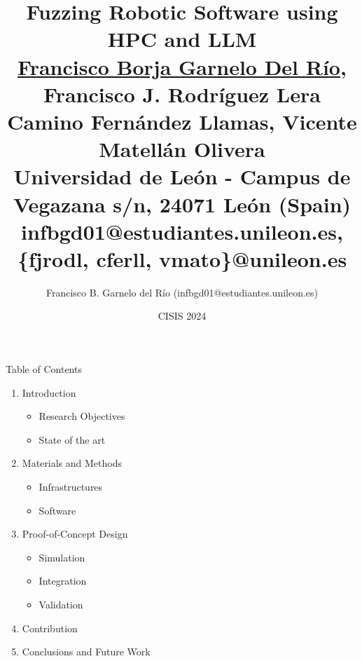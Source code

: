 \documentclass[aspectratio=169]{beamer}
\title[{\fz} robots HPC \& LLM]{\textbf{Fuzzing Robotic Software using HPC and LLM}\\
\small{\underline{Francisco Borja Garnelo Del Río}, Francisco J. Rodríguez Lera } \\
\small{Camino Fernández Llamas, Vicente Matellán Olivera} \\
\tiny{Universidad de León - 
Campus de Vegazana s/n, 24071 León (Spain)} \\
\tiny{infbgd01@estudiantes.unileon.es, \{fjrodl, cferll, vmato\}@unileon.es}
}
\author{Francisco B. Garnelo del Río (infbgd01@estudiantes.unileon.es)}
\date{CISIS 2024}
\begin{document}


\titleframe

\begin{frame}{Table of Contents}

\begin{enumerate}
\item Introduction
\begin{itemize}
    \item Research Objectives
    \item State of the art
\end{itemize}
\item Materials and Methods
\begin{itemize}
    \item Infrastructures
    \item Software
\end{itemize}
\item Proof-of-Concept Design
\begin{itemize}
    \item Simulation
    \item Integration
    \item Validation    
\end{itemize}    
\item Contribution
\item Conclusions and Future Work
\end{enumerate}
 \end{frame}

\end{document}
